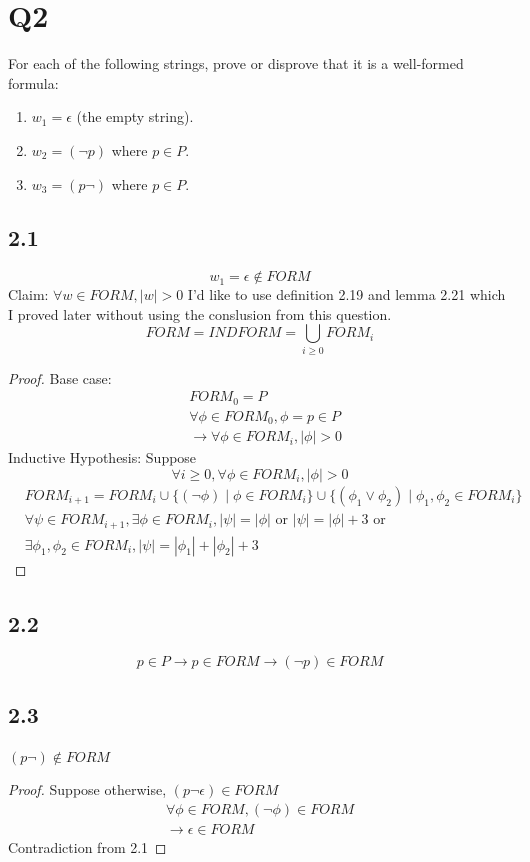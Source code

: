 \documentclass{article}
\begin{document}
\section*{Q2}
For each of the following strings, prove or disprove that it is a well-formed formula:
\begin{enumerate}
  \item $w_1 = \epsilon$ (the empty string).
  \item $w_2 = (\neg p)$ where $p \in P$.
  \item $w_3 = (p\neg)$ where $p \in P$.
\end{enumerate}
\subsection*{2.1}
\[w_1 = \epsilon \notin FORM\]
Claim: $\forall w \in FORM, |w| > 0$
I'd like to use definition 2.19 and lemma 2.21 which I proved later without using the conslusion from this question.
\[FORM = INDFORM = \bigcup_{i \geq 0}FORM_i\]
\begin{proof}
    Base case:
    \begin{align*}
        &FORM_0 = P\\
        &\forall \phi \in FORM_0, \phi = p \in P\\
        &\rightarrow \forall \phi \in FORM_i, |\phi| > 0
    \end{align*}
    Inductive Hypothesis: Suppose 
    \[\forall i \geq 0, \forall \phi \in FORM_i, |\phi| > 0\]
    \begin{align*}
        &FORM_{i+1} = FORM_i \cup \{(\neg \phi) \mid \phi \in FORM_i\} \cup \{(\phi_1 \lor \phi_2) \mid \phi_1, \phi_2 \in FORM_i\}\\
        &\forall \psi \in FORM_{i+1}, \exists \phi \in FORM_{i}, |\psi| = |\phi| \text{ or } |\psi| = |\phi| + 3 \text{ or } \\
        &\exists \phi_1, \phi_2 \in FORM_i, |\psi| = |\phi_1| + |\phi_2| + 3
    \end{align*}

\end{proof}
\subsection*{2.2}
\[ p \in P \rightarrow p \in FORM \rightarrow (\neg p)\in FORM\]
\subsection*{2.3}
$(p \neg) \not \in FORM$
\begin{proof}
    Suppose otherwise, $(p \neg \epsilon) \in FORM$
    \begin{align*}
        \forall \phi \in FORM, (\neg \phi) \in FORM\\
        \rightarrow \epsilon \in FORM 
    \end{align*}
    Contradiction from 2.1
\end{proof}
\end{document}
